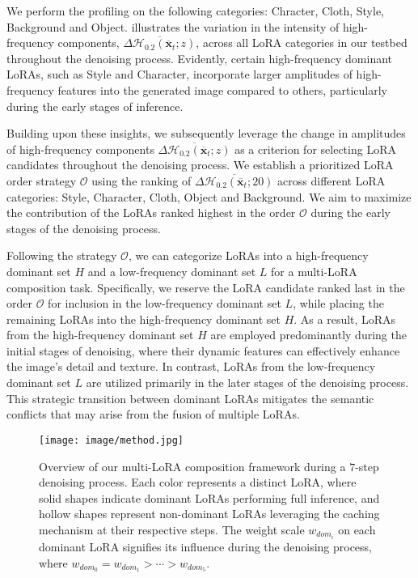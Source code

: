 We perform the profiling on the following categories: Chracter, Cloth, Style, Background and Object.
 illustrates the variation in the intensity of high-frequency components, $\overline{\Delta\mathcal{H}_{0.2}\left(\overline{\mathbf{x}}_{t};z\right)}$, across all LoRA categories in our testbed throughout the denoising process. Evidently, certain high-frequency dominant LoRAs, such as Style and Character, incorporate larger amplitudes of high-frequency features into the generated image compared to others, particularly during the early stages of inference.

Building upon these insights, we subsequently leverage the change in amplitudes of high-frequency components $\overline{\Delta\mathcal{H}_{0.2}\left(\overline{\mathbf{x}}_{t};z\right)}$ as a criterion for selecting LoRA candidates throughout the denoising process. We establish a prioritized LoRA order strategy $\mathcal{O}$ using the ranking of $\overline{\Delta\mathcal{H}_{0.2}\left(\overline{\mathbf{x}}_{t};20\right)}$ across different LoRA categories: Style, Character, Cloth, Object and Background. We aim to maximize the contribution of the LoRAs ranked highest in the order $\mathcal{O}$ during the early stages of the denoising process. 

Following the strategy $\mathcal{O}$, we can categorize LoRAs into a high-frequency dominant set $H$ and a low-frequency dominant set $L$ for a multi-LoRA composition task. Specifically, we reserve the LoRA candidate ranked last in the order $\mathcal{O}$ for inclusion in the low-frequency dominant set $L$, while placing the remaining LoRAs into the high-frequency dominant set $H$. As a result, LoRAs from the high-frequency dominant set $H$ are employed predominantly during the initial stages of denoising, where their dynamic features can effectively enhance the image’s detail and texture. In contrast, LoRAs from the low-frequency dominant set $L$ are utilized primarily in the later stages of the denoising process. This strategic transition between dominant LoRAs mitigates the semantic conflicts that may arise from the fusion of multiple LoRAs.

% 
\vspace{-7pt}
\begin{figure}[!b]
\setlength{\abovecaptionskip}{-6pt}
\setlength{\belowcaptionskip}{-12pt}
\begin{center}
\texttt{[image: image/method.jpg]}
\end{center}
\caption{Overview of our multi-LoRA composition framework during a $7$-step denoising process.  Each color represents a distinct LoRA, where solid shapes indicate dominant LoRAs performing full inference, and hollow shapes represent non-dominant LoRAs leveraging the caching mechanism at their respective steps. The weight scale $w_{dom_{i}}$ on each dominant LoRA signifies its influence during the denoising process, where $w_{dom_{0}}=w_{dom_{1}}>\cdots>w_{dom_{5}}$.}
\label{img:method}
\end{figure}

